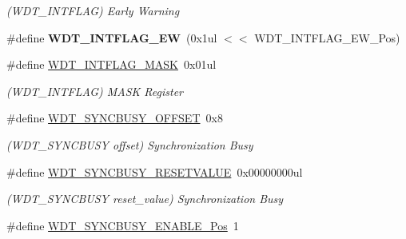 \begin{DoxyCompactItemize}
\begin{DoxyCompactList}\small\item\em (W\+D\+T\+\_\+\+I\+N\+T\+F\+L\+A\+G) Early Warning \end{DoxyCompactList}\item 
\hypertarget{group___s_a_m_l21___w_d_t_gaf010973ade015b854f7b5f12c440538d}{}\#define {\bfseries W\+D\+T\+\_\+\+I\+N\+T\+F\+L\+A\+G\+\_\+\+E\+W}~(0x1ul $<$$<$ W\+D\+T\+\_\+\+I\+N\+T\+F\+L\+A\+G\+\_\+\+E\+W\+\_\+\+Pos)\label{group___s_a_m_l21___w_d_t_gaf010973ade015b854f7b5f12c440538d}

\item 
\hypertarget{group___s_a_m_l21___w_d_t_ga0f9add7d544318a00033f236441e048e}{}\#define \hyperlink{group___s_a_m_l21___w_d_t_ga0f9add7d544318a00033f236441e048e}{W\+D\+T\+\_\+\+I\+N\+T\+F\+L\+A\+G\+\_\+\+M\+A\+S\+K}~0x01ul\label{group___s_a_m_l21___w_d_t_ga0f9add7d544318a00033f236441e048e}

\begin{DoxyCompactList}\small\item\em (W\+D\+T\+\_\+\+I\+N\+T\+F\+L\+A\+G) M\+A\+S\+K Register \end{DoxyCompactList}\item 
\hypertarget{group___s_a_m_l21___w_d_t_ga5ff5966b2f81dc8c7364dd59ed6c1ae1}{}\#define \hyperlink{group___s_a_m_l21___w_d_t_ga5ff5966b2f81dc8c7364dd59ed6c1ae1}{W\+D\+T\+\_\+\+S\+Y\+N\+C\+B\+U\+S\+Y\+\_\+\+O\+F\+F\+S\+E\+T}~0x8\label{group___s_a_m_l21___w_d_t_ga5ff5966b2f81dc8c7364dd59ed6c1ae1}

\begin{DoxyCompactList}\small\item\em (W\+D\+T\+\_\+\+S\+Y\+N\+C\+B\+U\+S\+Y offset) Synchronization Busy \end{DoxyCompactList}\item 
\hypertarget{group___s_a_m_l21___w_d_t_ga875a34b4a1874949a2dfb5047cf57785}{}\#define \hyperlink{group___s_a_m_l21___w_d_t_ga875a34b4a1874949a2dfb5047cf57785}{W\+D\+T\+\_\+\+S\+Y\+N\+C\+B\+U\+S\+Y\+\_\+\+R\+E\+S\+E\+T\+V\+A\+L\+U\+E}~0x00000000ul\label{group___s_a_m_l21___w_d_t_ga875a34b4a1874949a2dfb5047cf57785}

\begin{DoxyCompactList}\small\item\em (W\+D\+T\+\_\+\+S\+Y\+N\+C\+B\+U\+S\+Y reset\+\_\+value) Synchronization Busy \end{DoxyCompactList}\item 
\hypertarget{group___s_a_m_l21___w_d_t_ga5f9f84ef499127159a9edb0de1d36dcb}{}\#define \hyperlink{group___s_a_m_l21___w_d_t_ga5f9f84ef499127159a9edb0de1d36dcb}{W\+D\+T\+\_\+\+S\+Y\+N\+C\+B\+U\+S\+Y\+\_\+\+E\+N\+A\+B\+L\+E\+\_\+\+Pos}~1\label{group___s_a_m_l21___w_d_t_ga5f9f84ef499127159a9edb0de1d36dcb}


\end{DoxyCompactItemize}
